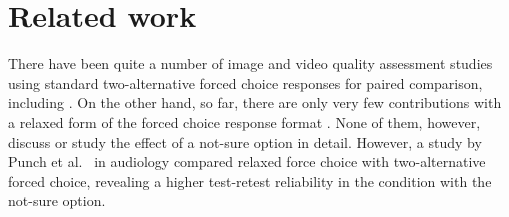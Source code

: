 \documentclass[a4paper,conference]{IEEEtran}
\begin{document}

\section{Related work}
There have been quite a number of image and video quality assessment studies using standard two-alternative forced choice responses for paired comparison, including \cite{watson2000proposal, charrier2007maximum, miao2008quantitative, menkovski2011value, mantiuk2012comparison, ponomarenko2013new, kumcu2016performance, nuutinen2016new, zhang2018unreasonable}. On the other hand, so far, there are only very few contributions with a relaxed form of the forced choice response format \cite{mcnally2017jpeg, sun2017mdid, men2021subjective}. None of them, however, discuss or study the effect of a not-sure option in detail. However, a study by Punch et al.\ \cite{punch2001paired} in audiology compared relaxed force choice with two-alternative forced choice, revealing a higher test-retest reliability in the condition with the not-sure option.

\end{document}
